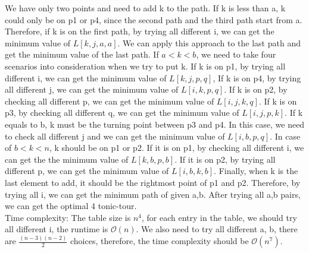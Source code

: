 \documentclass[12pt,letterpaper]{article}
\begin{document}
We have only two points and need to add k to the path. If k is less than a, k could only be on p1 or p4, since the second path and the third path start from a. Therefore, if k is on the first path, by trying all different i, we can get the minimum value of $L[k, j, a, a]$. We can apply this approach to the last path and get the minimum value of the last path. If $a < k < b$, we need to take four scenarios into consideration when we try to put k. If k is on p1, by trying all different i, we can get the minimum value of $L[k, j, p, q]$, If k is on p4, by trying all different j, we can get the minimum value of $L[i, k, p, q]$. If k is on p2, by checking all different p, we can get the minimum value of $L[i, j, k, q]$. If k is on p3, by checking all different q, we can get the minimum value of $L[i, j, p, k]$. If k equals to b, k must be the turning point between p3 and p4. In this case, we need to check all different j and we can get the minimum value of $L[i, b, p, q]$. In case of $b < k < n$, k should be on p1 or p2. If it is on p1, by checking all different i, we can get the the minimum value of $L[k, b, p, b]$. If it is on p2, by trying all different p, we can get the minimum value of $L[i, b, k, b]$. Finally, when k is the last element to add, it should be the rightmost point of p1 and p2. Therefore, by trying all i, we can get the minimum path of given a,b. After trying all a,b pairs, we can get the optimal 4 tonic-tour. \\
Time complexity:
The table size is $n^4$, for each entry in the table, we should try all different i, the runtime is $\mathcal{O}(n)$. We also need to try all different a, b, there are $\frac{(n-3)(n-2)}{2}$ choices, therefore, the time complexity should be $\mathcal{O}(n^7)$.
\end{document}
